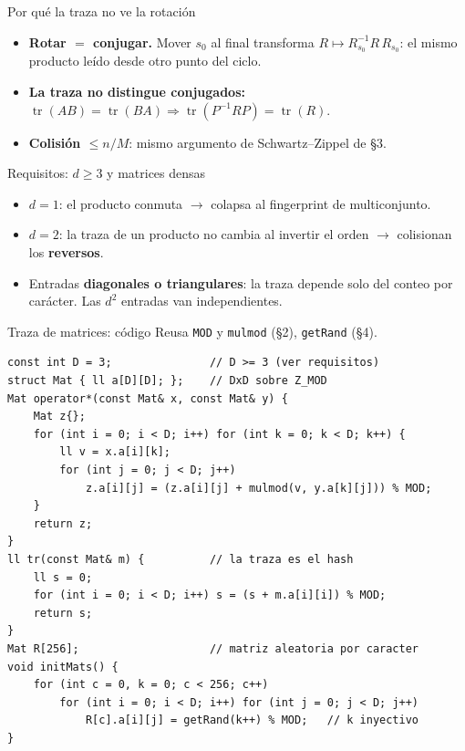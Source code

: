 \documentclass{beamer}
\begin{document}
\begin{frame}{Por qué la traza no ve la rotación}
\begin{itemize}
    \item \textbf{Rotar $=$ conjugar.} Mover $s_0$ al final transforma $R \mapsto R_{s_0}^{-1} R\, R_{s_0}$: el mismo producto leído desde otro punto del ciclo.
    \item \textbf{La traza no distingue conjugados:} $\operatorname{tr}(AB) = \operatorname{tr}(BA) \Rightarrow \operatorname{tr}(P^{-1}RP) = \operatorname{tr}(R)$.
    \item \textbf{Colisión $\le n/M$}: mismo argumento de Schwartz--Zippel de \S3.
\end{itemize}
\pause
\begin{block}{Requisitos: $d \ge 3$ y matrices densas}
\begin{itemize}
    \item $d = 1$: el producto conmuta $\to$ colapsa al fingerprint de multiconjunto.
    \item $d = 2$: la traza de un producto no cambia al invertir el orden $\to$ colisionan los \textbf{reversos}.
    \item Entradas \textbf{diagonales o triangulares}: la traza depende solo del conteo por carácter. Las $d^2$ entradas van independientes.
\end{itemize}
\end{block}
\end{frame}

\begin{frame}[fragile]{Traza de matrices: código}
Reusa \texttt{MOD} y \texttt{mulmod} (\S2), \texttt{getRand} (\S4).
{\scriptsize
\begin{verbatim}
const int D = 3;               // D >= 3 (ver requisitos)
struct Mat { ll a[D][D]; };    // DxD sobre Z_MOD
Mat operator*(const Mat& x, const Mat& y) {
    Mat z{};
    for (int i = 0; i < D; i++) for (int k = 0; k < D; k++) {
        ll v = x.a[i][k];
        for (int j = 0; j < D; j++)
            z.a[i][j] = (z.a[i][j] + mulmod(v, y.a[k][j])) % MOD;
    }
    return z;
}
ll tr(const Mat& m) {          // la traza es el hash
    ll s = 0;
    for (int i = 0; i < D; i++) s = (s + m.a[i][i]) % MOD;
    return s;
}
Mat R[256];                    // matriz aleatoria por caracter
void initMats() {
    for (int c = 0, k = 0; c < 256; c++)
        for (int i = 0; i < D; i++) for (int j = 0; j < D; j++)
            R[c].a[i][j] = getRand(k++) % MOD;   // k inyectivo
}
\end{verbatim}
}
\end{frame}
\end{document}
